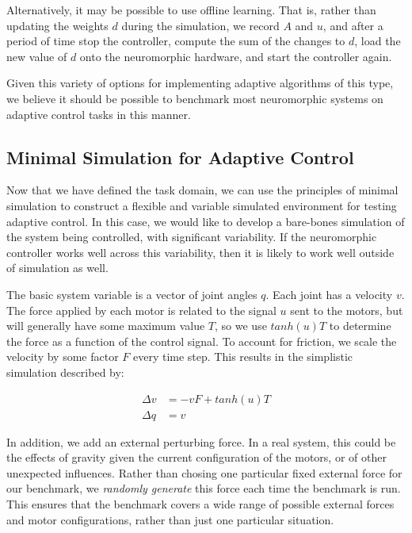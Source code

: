 \documentclass{frontiersSCNS} %
\begin{document}
Alternatively, it may be possible to use offline learning.  That is, rather than updating
the weights $d$ during the simulation, we record $A$ and $u$, and after
a period of time stop the controller, compute the sum of the changes
to $d$, load the new value of $d$ onto the neuromorphic hardware, and
start the controller again.

Given this variety of options for implementing adaptive algorithms of this type, 
we believe it should be possible to benchmark most neuromorphic systems on 
adaptive control tasks in this manner.

\subsection{Minimal Simulation for Adaptive Control}

Now that we have defined the task domain, we can use the principles of minimal
simulation to construct a flexible and variable simulated environment for
testing adaptive control.  In this case, we would like to develop a bare-bones simulation of
the system being controlled, with significant variability.  If the neuromorphic
controller works well across this variability, then it is likely to work well
outside of simulation as well.

The basic system variable is a vector of joint angles $q$.  
Each joint has a velocity $v$.  The force applied by each motor is 
related to the signal $u$ sent to the motors, but will generally have some
maximum value $T$, so we use $tanh(u)T$ to determine the force as a function of the control signal. To account for friction, we 
scale the velocity by some factor $F$ every time step.  
This results in the simplistic simulation described by:

\begin{align}
    \Delta v & =  -v F + tanh(u)T \\
    \Delta q & = v
\end{align}

In addition, we add an external perturbing force.  In a real system,
this could be the effects of gravity given the current configuration of the
motors, or of other unexpected influences.  
Rather than chosing one particular fixed external force for our benchmark,
we \emph{randomly generate} this force each time the benchmark is run.  This
ensures that the benchmark covers a wide range of possible external forces
and motor configurations, rather than just one particular situation.
\end{document}
